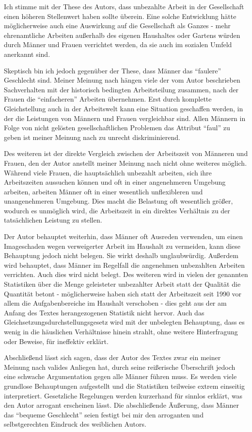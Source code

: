 \documentclass[11pt]{article}
\begin{document}
Ich stimme mit der These des Autors, dass unbezahlte Arbeit in der Gesellschaft einen höheren Stellenwert haben sollte überein. Eine solche Entwicklung hätte möglicherweise auch eine Auswirkung auf die Gesellschaft als Ganzes - mehr ehrenamtliche Arbeiten außerhalb des eigenen Haushaltes oder Gartens würden durch Männer und Frauen verrichtet werden, da sie auch im sozialen Umfeld anerkannt sind.

Skeptisch bin ich jedoch gegenüber der These, dass Männer das ``faulere'' Geschlecht sind. Meiner Meinung nach hängen viele der vom Autor beschrieben Sachverhalten mit der historisch bedingten Arbeitsteilung zusammen, nach der Frauen die ``einfacheren'' Arbeiten übernehmen. Erst durch komplette Gleichstellung auch in der Arbeitswelt kann eine Situation geschaffen werden, in der die Leistungen von Männern und Frauen vergleichbar sind. Allen Männern in Folge von nicht gelösten gesellschaftlichen Problemen das Attribut ``faul'' zu geben ist meiner Meinung nach zu unrecht diskriminierend.

Des weiteren ist der direkte Vergleich zwischen der Arbeitszeit von Männeren und Frauen, den der Autor anstellt meiner Meinung nach nicht ohne weiteres möglich. Während viele Frauen, die hauptsächlich unbezahlt arbeiten, sich ihre Arbeitszeiten aussuchen können und oft in einer angenehmeren Umgebung arbeiten, arbeiten Männer oft in einer wesentlich unflexibleren und unangenehmeren Umgebung. Dies macht die Belastung oft wesentlich größer, wodurch es unmöglich wird, die Arbeitszeit in ein direktes Verhältnis zu der tatsächlichen Leistung zu stellen.

Der Autor behauptet weiterhin, dass Männer oft Ausreden verwenden, um einen Imageschaden wegen verweigerter Arbeit im Haushalt zu vermeiden, kann diese Behauptung jedoch nicht belegen. Sie wirkt deshalb unglaubwürdig. Außerdem wird behauptet, dass Männer im Regelfall die angenehmen unbezahlten Arbeiten verrichten. Auch dies wird nicht belegt. Des weiteren wird in vielen der genannten Statistiken über die Menge geleisteter unbezahlter Arbeit statt der Qualität die Quantität betont - möglicherweise haben sich statt der Arbeitszeit seit 1990 vor allem die Aufgabenbereiche im Haushalt verschoben - dies geht aus der am Anfang des Textes herangezogenen Statistik nicht hervor. Auch das Gleichsetzungsdurchstellungsgesetz wird mit der unbelegten Behauptung, dass es wenig in die häuslichen Verhältnisse hinein strahlt, ohne weitere Hinterfragung oder Beweise, für ineffektiv erklärt.

Abschließend lässt sich sagen, dass der Autor des Textes zwar ein meiner Meinung nach valides Anliegen hat, durch seine reißerische Überschrift jedoch eine schwache Argumentation gegen alle Männer führen muss. Es werden viele grundlose Behauptungen aufgestellt und die Statistiken teilweise extrem einseitig interpretiert. Gesetzliche Regelungen werden kurzerhand für sinnlos erklärt, was den Autor arrogant erscheinen lässt. Die abschließende Äußerung, dass Männer das ``bequeme Geschlecht'' seien festigt bei mir den arroganten und selbstgerechten Eindruck des weiblichen Autors.
\end{document}
